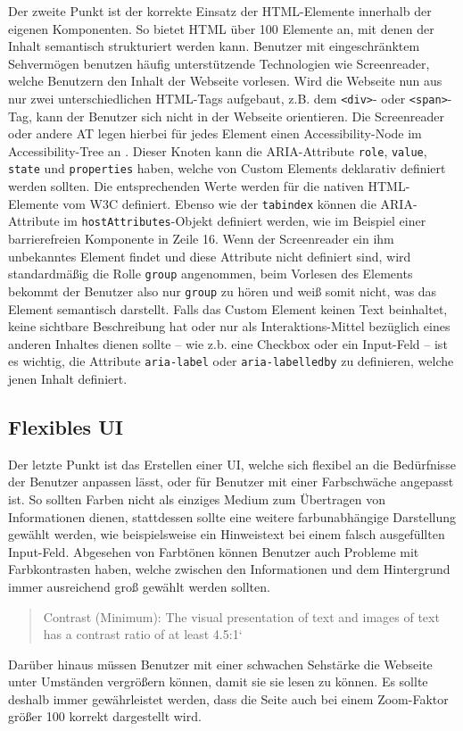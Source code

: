 Der zweite Punkt ist der korrekte Einsatz der \ac{HTML}-Elemente innerhalb der eigenen Komponenten. So bietet \ac{HTML} über 100 Elemente an, mit denen der Inhalt semantisch strukturiert werden kann. Benutzer mit eingeschränktem Sehvermögen benutzen häufig unterstützende Technologien wie Screenreader, welche Benutzern den Inhalt der Webseite vorlesen. Wird die Webseite nun aus nur zwei unterschiedlichen \ac{HTML}-Tags aufgebaut, z.B. dem \texttt{\textless{}div\textgreater{}}- oder \texttt{\textless{}span\textgreater{}}-Tag, kann der Benutzer sich nicht in der Webseite orientieren. Die Screenreader oder andere \ac{AT} legen hierbei für jedes Element einen Accessibility-Node im Accessibility-Tree an \cite{citeulike:13915306}. Dieser Knoten kann die \ac{ARIA}-Attribute \texttt{role}, \texttt{value}, \texttt{state} und \texttt{properties} haben, welche von Custom Elements deklarativ definiert werden sollten. Die entsprechenden Werte werden für die nativen \ac{HTML}-Elemente vom \ac{W3C} definiert. Ebenso wie der \texttt{tabindex} können die \ac{ARIA}-Attribute im \texttt{hostAttributes}-Objekt definiert werden, wie im Beispiel einer barrierefreien Komponente in Zeile 16. Wenn der Screenreader ein ihm unbekanntes Element findet und diese Attribute nicht definiert sind, wird standardmäßig die Rolle \texttt{group} angenommen, beim Vorlesen des Elements bekommt der Benutzer also nur \texttt{group} zu hören und weiß somit nicht, was das Element semantisch darstellt. Falls das Custom Element keinen Text beinhaltet, keine sichtbare Beschreibung hat oder nur als Interaktions-Mittel bezüglich eines anderen Inhaltes dienen sollte -- wie z.b. eine Checkbox oder ein Input-Feld -- ist es wichtig, die Attribute \texttt{aria-label} oder \texttt{aria-labelledby} zu definieren, welche jenen Inhalt definiert.


\subsection{Flexibles UI}\label{flexibles-ui}

Der letzte Punkt ist das Erstellen einer \ac{UI}, welche sich flexibel an die Bedürfnisse der Benutzer anpassen lässt, oder für Benutzer mit einer Farbschwäche angepasst ist. So sollten Farben nicht als einziges Medium zum Übertragen von Informationen dienen, stattdessen sollte eine weitere farbunabhängige Darstellung gewählt werden, wie beispielsweise ein Hinweistext bei einem falsch ausgefüllten Input-Feld. Abgesehen von Farbtönen können Benutzer auch Probleme mit Farbkontrasten haben, welche zwischen den Informationen und dem Hintergrund immer ausreichend groß gewählt werden sollten.

\begin{quote}
Contrast (Minimum): The visual presentation of text and images of text has a contrast ratio of at least 4.5:1` \cite{citeulike:13915310}
\end{quote}

Darüber hinaus müssen Benutzer mit einer schwachen Sehstärke die Webseite unter Umständen vergrößern können, damit sie sie lesen zu können. Es sollte deshalb immer gewährleistet werden, dass die Seite auch bei einem Zoom-Faktor größer 100 korrekt dargestellt wird.
